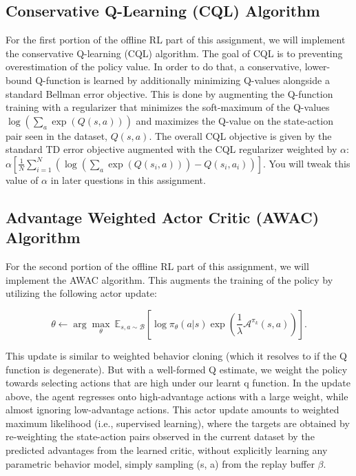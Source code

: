 \documentclass{article}
\begin{document}
\subsection{Conservative Q-Learning (CQL) Algorithm}
For the first portion of the offline RL part of this assignment, we will implement the conservative Q-learning (CQL) algorithm. The goal of CQL is to preventing overestimation of the policy value. In order to do that, a conservative, lower-bound Q-function is learned by additionally minimizing Q-values alongside a standard Bellman error objective. This is done by augmenting the Q-function training with a regularizer that minimizes the soft-maximum of the Q-values $\log \left( \sum_{a} \exp(Q(s, a)) \right)$ and maximizes the Q-value on the state-action pair seen in the dataset, $Q(s, a)$. The overall CQL objective is given by the standard TD error objective augmented with the CQL regularizer weighted by $\alpha$: $\alpha \left[\frac{1}{N}\sum_{i=1}^N \left(\log\left(\sum_{a} \exp(Q(s_i, a))\right) - Q(s_i, a_i) \right) \right]$. You will tweak this value of $\alpha$ in later questions in this assignment.  

\subsection{Advantage Weighted Actor Critic (AWAC) Algorithm}
For the second portion of the offline RL part of this assignment, we will implement the AWAC algorithm. This augments the training of the policy by utilizing the following actor update:

\begin{equation}
    \theta \leftarrow \arg \max_\theta~ \mathbb{E}_{s, a \sim \mathcal{B}} \left[\log \pi_{\theta}(a|s) \exp(\frac{1}{\lambda} \mathcal{A}^{\pi_{k}}(s,a)) \right].
\end{equation}

This update is similar to weighted behavior cloning (which it resolves to if the Q function is degenerate). But with a well-formed Q estimate, we weight the policy towards selecting actions that are high under our learnt q function. In the update above, the agent regresses onto high-advantage actions with a large weight, while almost ignoring low-advantage actions. This actor update amounts to weighted maximum likelihood (i.e., supervised learning), where the targets are obtained by re-weighting the state-action pairs observed in the current dataset
by the predicted advantages from the learned critic, without
explicitly learning any parametric behavior model, simply
sampling (s, a) from the replay buffer $\beta$. 
\end{document}
